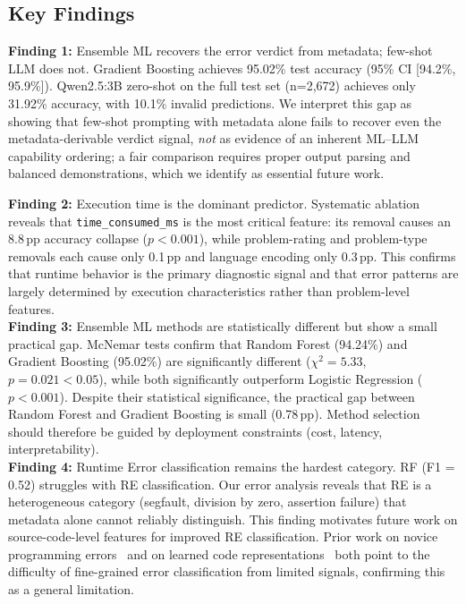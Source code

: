 \documentclass[acmsmall]{acmart}
\begin{document}
\subsection*{Key Findings}

\textbf{Finding 1:} Ensemble ML recovers the error verdict from metadata;
few-shot LLM does not. Gradient Boosting achieves 95.02\% test accuracy (95\%
CI [94.2\%, 95.9\%]). Qwen2.5:3B zero-shot on the full test set (n=2,672)
achieves only 31.92\% accuracy, with 10.1\% invalid predictions. We interpret
this gap as showing that few-shot prompting with metadata alone fails to
recover even the metadata-derivable verdict signal, \emph{not} as evidence of
an inherent ML--LLM capability ordering; a fair comparison requires proper
output parsing and balanced demonstrations, which we identify as essential
future work.

\textbf{Finding 2:} Execution time is the dominant predictor. Systematic
ablation reveals that \texttt{time\_consumed\_ms} is the most critical
feature: its removal causes an 8.8\,pp accuracy collapse ($p < 0.001$), while
problem-rating and problem-type removals each cause only 0.1\,pp and language
encoding only 0.3\,pp. This confirms that runtime behavior is the primary
diagnostic signal and that error patterns are largely determined by execution
characteristics rather than problem-level features.\\

\textbf{Finding 3:} Ensemble ML methods are statistically different but show a
small practical gap. McNemar tests confirm that Random Forest (94.24\%) and
Gradient Boosting (95.02\%) are significantly different ($\chi^2 = 5.33$,
$p = 0.021 < 0.05$), while both significantly outperform Logistic Regression
($p < 0.001$). Despite their statistical significance, the practical gap
between Random Forest and Gradient Boosting is small (0.78\,pp). Method
selection should therefore be guided by deployment constraints (cost, latency,
interpretability).\\

\textbf{Finding 4:} Runtime Error classification remains the hardest category.
RF (F1 = 0.52) struggles with RE classification. Our error analysis reveals
that RE is a heterogeneous category (segfault, division by zero, assertion
failure) that metadata alone cannot reliably distinguish. This finding
motivates future work on source-code-level features for improved RE
classification. Prior work on novice programming errors~\cite{altadmri2015most} and on
learned code representations~\cite{allamanis2018learning} both point to the
difficulty of fine-grained error classification from limited signals,
confirming this as a general limitation.\\
\end{document}
